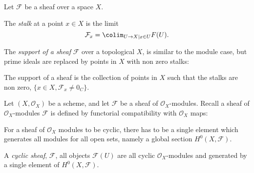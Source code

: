     Let \( \mathcal{F}\) be a sheaf over a space \(X\). 
    
    \begin{defn} The \emph{stalk} at a point \(x\in X\) is the limit
    \[ \mathcal{F}_x = \colim_{U \rightarrow X | x\in U} F(U).\]
    \end{defn}
    
    The \emph{support of a sheaf} \( \mathcal{F}\) over a topological \(X\),  is similar to the module case, but prime ideals are replaced by points in \(X\) with non zero stalks:
    
    \begin{defn} 
    The support of a sheaf is the collection of points in \(X\) such that the stalks are non zero, \( \{x \in X, \mathcal{F}_x \neq 0_C \} \).
    \end{defn}
    
    Let \( (X, \mathcal{O}_X)\) be a scheme, and let \(\mathcal{F}\) be a sheaf of \( \mathcal{O}_X\)-modules. Recall a sheaf of \( \mathcal{O}_X\)-modules \(\mathcal{F}\) is defined by functorial compatibility with \( \mathcal{O}_X\) maps:
    \begin{center}
    \end{center}
    
    
    For a sheaf of \( \mathcal{O}_X\) modules to be cyclic, there has to be a single element which generates all modules for all open sets, namely a global section \(H^0(X,\mathcal{F})\).
    
    \begin{defn} A \emph{cyclic sheaf}, \(\mathcal{F}\), all objects
    \(\mathcal{F}(U)\) are all cyclic \( \mathcal{O}_X\)-modules and generated by a single element of \(H^0(X,\mathcal{F})\).
    \end{defn}
    
    
    
